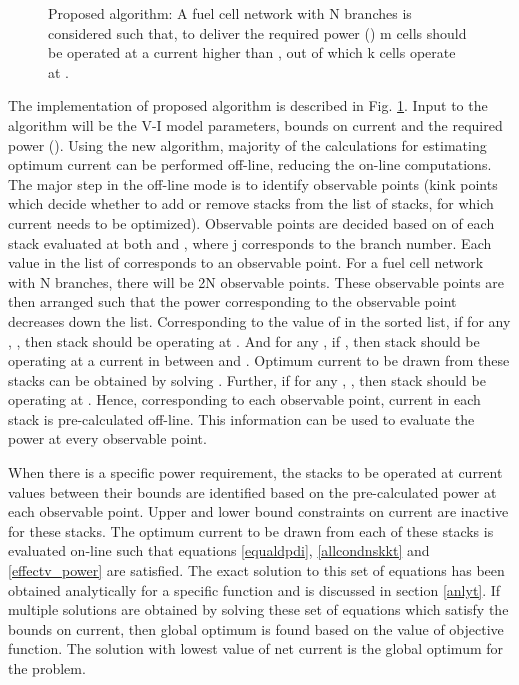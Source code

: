 \documentclass[twocolumn]{autart}
\begin{document}
\begin{figure}[h]
\caption{Proposed algorithm: A fuel cell network with N branches is considered such that, to deliver the required power () m cells should be operated at a current higher than , out of which k cells operate at .}\label{algo}
\end{figure}
The implementation of proposed algorithm is described in Fig. \ref{algo}. Input to the algorithm will be the V-I model parameters, bounds on current and the required power (). Using the new algorithm, majority of the calculations for estimating optimum current can be performed off-line, reducing the on-line computations. The major step in the off-line mode is to identify observable points (kink points which decide whether to add or remove stacks from the list of stacks, for which current needs to be optimized). Observable points are decided based on  of each stack evaluated at both  and , where j corresponds to the branch number. Each value in the list of  corresponds to an observable point. For a fuel cell network with N branches, there will be 2N observable points. These observable points are then arranged such that the power corresponding to the observable point decreases down the list. Corresponding to the  value of  in the sorted list, if for any , , then  stack should be operating at . And for any  , if , then  stack should be operating at a current in between  and . Optimum current to be drawn from these stacks can be obtained by solving . Further, if for any , , then  stack should be operating at . Hence, corresponding to each observable point, current in each stack is pre-calculated off-line. This information can be used to evaluate the power at every observable point.

When there is a specific power requirement, the stacks to be operated at current values between their bounds are identified based on the pre-calculated power at each observable point. Upper and lower bound constraints on current are inactive for these stacks. The optimum current to be drawn from each of these stacks is evaluated on-line such that equations \eqref{equaldpdi}, \eqref{allcondnskkt} and \eqref{effectv_power} are satisfied. The exact solution to this set of equations has been obtained analytically for a specific function  and is discussed in section \ref{anlyt}. If multiple solutions are obtained by solving these set of equations which satisfy the bounds on current, then global optimum is found based on the value of objective function. The solution with lowest value of net current is the global optimum for the problem.
 
\end{document}

